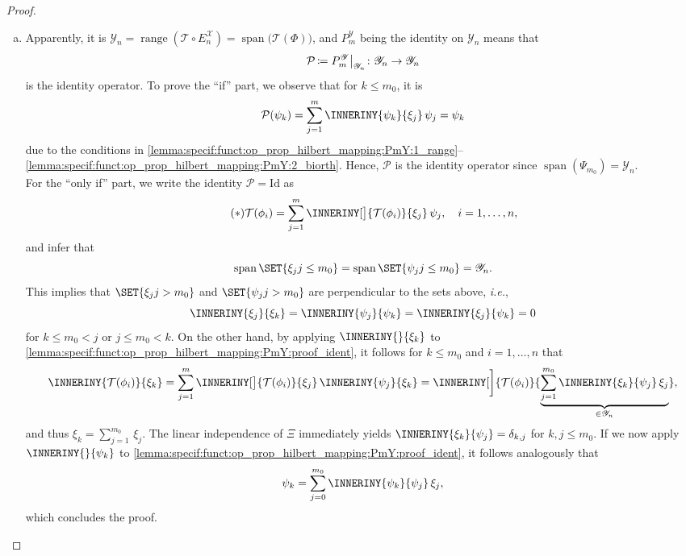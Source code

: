 \documentclass[a4paper]{paper}
\newcommand*{\SPC}[1]{{\ensuremath{\mathscr{#1}}}}
\newcommand*{\SPCY}{\SPC{Y}}
\newcommand*{\OP}[1]{{\ensuremath{\mathcal{#1}}}}
\newcommand*{\OPP}{\OP{P}}
\newcommand*{\OPT}{\OP{T}}
\newcommand*{\OPID}{\OP{\mathrm{Id}}}
\newcommand*{\EXT}[2]{\ensuremath{E_{#1}^{#2}}}
\newcommand*{\PROJ}[2]{\ensuremath{P_{#1}^{#2}}}
\newcommand*{\EnX}{{\ensuremath{\EXT{n}{\SPC{X}}}}}
\newcommand*{\PmY}{{\ensuremath{\PROJ{m}{\SPCY}}}}
\providecommand\GIVEN{}  %
\DeclareMathOperator{\RANGE}{range}
\DeclareMathOperator{\SPAN}{span}
\DeclareMathOperator{\DEFEQ}{{\coloneqq}}
\newcommand*{\FUNCRESTR}[2]{{\ensuremath{\left. \vphantom{g_{g_g}} {#1} \right|_{#2}}}}
\newcommand{\ie}{\textsl{i.e.}\xspace}
\begin{document}
\begin{proof}~
 \begin{enumerate}[(a)]
  \item Apparently, it is $\SPCY_n = \RANGE(\OPT \circ \EnX) = \SPAN\big( \OPT(\Phi) \big)$, and $\PmY$ being the 
  identity on $\SPCY_n$ means that
  \begin{equation*}
   \OPP \DEFEQ \FUNCRESTR{\PmY}{\SPCY_n} \colon \SPCY_n \to \SPCY_n
  \end{equation*}
  is the identity operator. To prove the ``if'' part, we observe that for $k\leq m_0$, it is
  \begin{equation*}
   \OPP(\psi_k) = \sum_{j=1}^m \INNERINY{\psi_k}{\xi_j}\, \psi_j = \psi_k
  \end{equation*}
  due to the conditions in 
  \eqref{lemma:specif:funct:op_prop_hilbert_mapping:PmY:1_range}--%
  \eqref{lemma:specif:funct:op_prop_hilbert_mapping:PmY:2_biorth}.
  Hence, $\OPP$ is the identity operator since $\SPAN(\Psi_{m_0}) = \SPCY_n$. \\
  For the ``only if'' part, we write the identity $\OPP = \OPID$ as
  \begin{equation}
   \label{lemma:specif:funct:op_prop_hilbert_mapping:PmY:proof_ident}
   \tag{{$\ast$}}
   \OPT(\phi_i) 
   = \sum_{j=1}^m \INNERINY[\big]{\OPT(\phi_i)}{\xi_j}\, \psi_j, \quad i=1,\dots,n,
  \end{equation}
  and infer that
  \begin{equation*}
   \SPAN\SET{ \xi_j \GIVEN j\leq m_0 } = \SPAN\SET{ \psi_j \GIVEN j\leq m_0 } = \SPCY_n.
  \end{equation*}
  This implies that $\SET{ \xi_j \GIVEN j > m_0 }$ and $\SET{ \psi_j \GIVEN j > m_0 }$ are perpendicular to the sets 
  above, \ie,
  \begin{equation*}
   \INNERINY{\xi_j}{\xi_k} = \INNERINY{\psi_j}{\psi_k} = \INNERINY{\xi_j}{\psi_k} = 0
  \end{equation*}
  for $k \leq m_0 < j$ or $j \leq m_0 < k$. On the other hand, by applying $\INNERINY{}{\xi_k}$ to 
  \eqref{lemma:specif:funct:op_prop_hilbert_mapping:PmY:proof_ident}, it follows for $k \leq m_0$ and $i=1,\dots,n$ 
  that
  \begin{equation*}
   \INNERINY{\OPT(\phi_i)}{\xi_k}
   = \sum_{j=1}^m \INNERINY[\big]{\OPT(\phi_i)}{\xi_j}\, \INNERINY{\psi_j}{\xi_k}
   = \INNERINY[\bigg]{\OPT(\phi_i)}{\underbrace{\sum_{j=1}^{m_0} \INNERINY{\xi_k}{\psi_j}\, \xi_j}_{\in \SPCY_n}},
  \end{equation*}
  and thus $\xi_k = \sum_{j=1}^{m_0} \, \xi_j$. The linear independence of $\Xi$ 
  immediately yields $\INNERINY{\xi_k}{\psi_j} = \delta_{k,j}$ for $k,j \leq m_0$. If we now apply
  $\INNERINY{}{\psi_k}$ to \eqref{lemma:specif:funct:op_prop_hilbert_mapping:PmY:proof_ident}, it follows analogously 
  that
  \begin{equation*}
   \psi_k = \sum_{j=0}^{m_0} \INNERINY{\psi_k}{\psi_j}\, \xi_j,
  \end{equation*}
  which concludes the proof.
  

\end{enumerate}
\end{proof}
\end{document}
